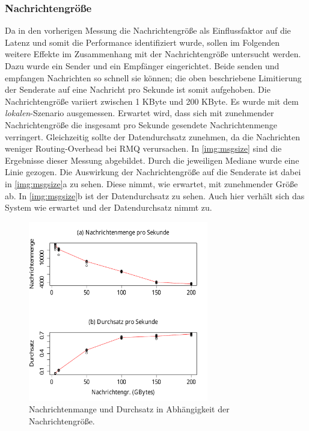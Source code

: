 \subsubsection{Nachrichtengröße}
Da in den vorherigen Messung die Nachrichtengröße als Einflussfaktor auf die Latenz und somit die Performance identifiziert wurde, sollen im Folgenden weitere Effekte im Zusammenhang mit der Nachrichtengröße untersucht werden. Dazu wurde ein Sender und ein Empfänger eingerichtet. Beide senden und empfangen Nachrichten so schnell sie können; die oben beschriebene Limitierung der Senderate auf eine Nachricht pro Sekunde ist somit aufgehoben. Die Nachrichtengröße variiert zwischen 1 KByte und 200 KByte. Es wurde mit dem \textit{lokalen}-Szenario ausgemessen. Erwartet wird, dass sich mit zunehmender Nachrichtengröße die insgesamt pro Sekunde gesendete Nachrichtenmenge verringert. Gleichzeitig sollte der Datendurchsatz zunehmen, da die Nachrichten weniger Routing-Overhead bei RMQ verursachen.
In \autoref{img:msgsize} sind die Ergebnisse dieser Messung abgebildet. Durch die jeweiligen Mediane wurde eine Linie gezogen. Die Auswirkung der Nachrichtengröße auf die Senderate ist dabei in \autoref{img:msgsize}a zu sehen. Diese nimmt, wie erwartet, mit zunehmender Größe ab. In \autoref{img:msgsize}b ist der Datendurchsatz zu sehen. Auch hier verhält sich das System wie erwartet und der Datendurchsatz nimmt zu.
\begin{figure}
\center
  \includegraphics[width=0.7\textwidth]{images/measurement/msg-rate-vs-send-bytes.pdf}
  \caption{Nachrichtenmange und Durchsatz in Abhängigkeit der Nachrichtengröße.}
  \label{img:msgsize}
\end{figure}

